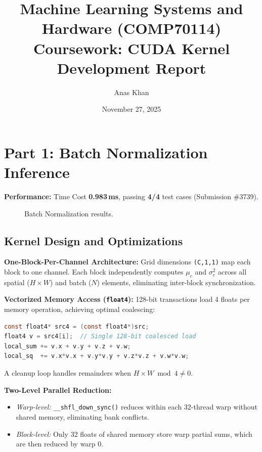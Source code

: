 \documentclass[11pt]{article}
\title{\vspace{-1.5cm}\textbf{Machine Learning Systems and Hardware (COMP70114)}\\
\large Coursework: CUDA Kernel Development Report\vspace{-0.3cm}}
\author{Anas Khan}
\date{November 27, 2025}
\begin{document}
\maketitle

\section{Part 1: Batch Normalization Inference}

\textbf{Performance:} Time Cost \textbf{0.983\,ms}, passing \textbf{4/4} test cases (Submission \#3739).

\begin{figure}[H]
\centering
{}
\vspace{-0.2cm}
\caption{Batch Normalization results.}
\label{fig:bn}
\end{figure}
\vspace{-0.4cm}

\subsection*{Kernel Design and Optimizations}

\textbf{One-Block-Per-Channel Architecture:} Grid dimensions \texttt{(C,1,1)} map each block to one channel. Each block independently computes $\mu_c$ and $\sigma^2_c$ across all spatial ($H \times W$) and batch ($N$) elements, eliminating inter-block synchronization.

\textbf{Vectorized Memory Access (\texttt{float4}):} 128-bit transactions load 4 floats per memory operation, achieving optimal coalescing:
\begin{lstlisting}[language=C]
const float4* src4 = (const float4*)src;
float4 v = src4[i];  // Single 128-bit coalesced load
local_sum += v.x + v.y + v.z + v.w;
local_sq  += v.x*v.x + v.y*v.y + v.z*v.z + v.w*v.w;
\end{lstlisting}
\vspace{-0.2cm}
A cleanup loop handles remainders when $H \times W \bmod 4 \neq 0$.

\textbf{Two-Level Parallel Reduction:}
\begin{itemize}
    \item \textit{Warp-level:} \texttt{\_\_shfl\_down\_sync()} reduces within each 32-thread warp without shared memory, eliminating bank conflicts.
    \item \textit{Block-level:} Only 32 floats of shared memory store warp partial sums, which are then reduced by warp 0.
\end{itemize}
\end{document}
